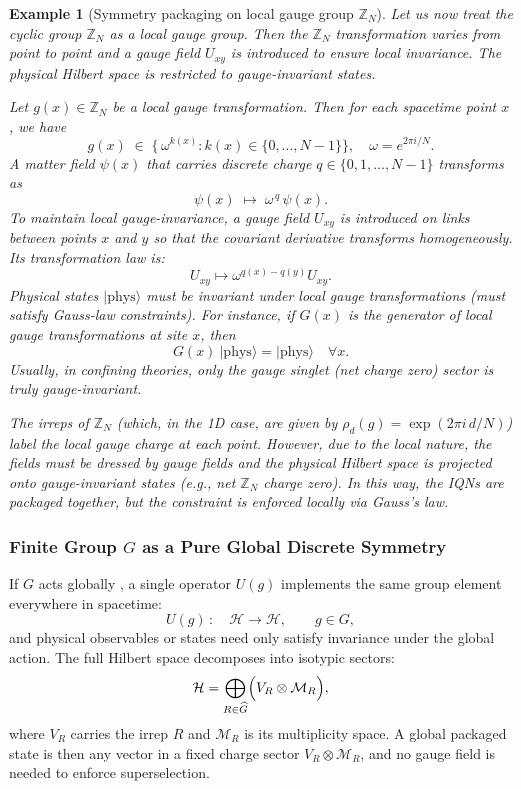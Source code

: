 \documentclass[12pt,a4paper]{article}
\newtheorem{example}{Example}
\begin{document}
\begin{example}[Symmetry packaging on local gauge group $\mathbb{Z}_N$]
	Let us now treat the cyclic group $\mathbb{Z}_N$ as a local gauge group.
	Then the $\mathbb{Z}_N$ transformation varies from point to point and a gauge field $U_{xy}$ is introduced to ensure local invariance.
	The physical Hilbert space is restricted to gauge-invariant states.
	
	
	Let $g(x) \in \mathbb{Z}_N$ be a local gauge transformation.
	Then for each spacetime point $x$, we have
	\[
	g(x) \;\in\;\{\,\omega^{k(x)}:k(x)\in\{0,\dots,N-1\}\}, 
	\quad \omega = e^{2\pi i/N}.
	\]
	A matter field $\psi(x)$  that carries discrete charge $q\in \{0,1,\dots,N-1\}$ transforms as
	\[
	\psi(x) \;\mapsto\;\omega^{\,q}\,\psi(x).
	\]
	To maintain local gauge-invariance, a gauge field $U_{xy}$ is introduced on links between points $x$ and $y$ so that the covariant derivative transforms homogeneously.
	Its transformation law is:
	\[
	U_{xy} \mapsto \omega^{q(x)-q(y)}U_{xy}.
	\]
	Physical states $|\mathrm{phys}\rangle$ must be invariant under local gauge transformations (must satisfy Gauss-law constraints).
	For instance, if $G(x)$ is the generator of local gauge transformations at site $x$, then
	\[
	G(x)~ |\mathrm{phys}\rangle = |\mathrm{phys}\rangle \quad \forall x.
	\]
	Usually, in confining theories, only the gauge singlet (net charge zero) sector is truly gauge-invariant.
	
	
	The irreps of $\mathbb{Z}_N$ (which, in the 1D case, are given by $\rho_d(g) = \exp(2\pi i\,d/N)$) label the local gauge charge at each point.
	However, due to the local nature, the fields must be dressed by gauge fields and the physical Hilbert space is projected onto gauge-invariant states (e.g., net $\mathbb{Z}_N$ charge zero).
	In this way, the IQNs are packaged together, but the constraint is enforced locally via Gauss’s law.
\end{example}



\subsubsection{Finite Group $G$ as a Pure Global Discrete Symmetry}

If $G$ acts globally \cite{Potts1952,Jose1977}, a single operator $U(g)$ implements the same group element everywhere in spacetime:
$$
U(g)\,:\quad \mathcal H \to \mathcal H, \qquad g \in G,
$$
and physical observables or states need only satisfy invariance under the global action.
The full Hilbert space decomposes into isotypic sectors:
$$
\mathcal H
= \bigoplus_{R\in\widehat G}
\Bigl(V_R\otimes\mathcal M_R\Bigr),
$$
where $V_R$ carries the irrep $R$ and $\mathcal M_R$ is its multiplicity space.
A global packaged state is then any vector in a fixed charge sector $V_R\otimes\mathcal M_R$, and no gauge field is needed to enforce superselection.
\end{document}
